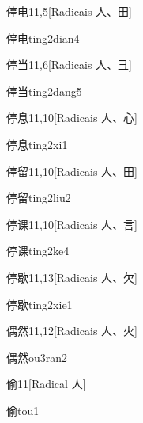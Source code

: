 \begin{entry}{停电}{11,5}[Radicais ⼈、⽥]
  \begin{phonetics}{停电}{ting2dian4}
  \end{phonetics}
\end{entry}

\begin{entry}{停当}{11,6}[Radicais ⼈、⼹]
  \begin{phonetics}{停当}{ting2dang5}
  \end{phonetics}
\end{entry}

\begin{entry}{停息}{11,10}[Radicais ⼈、⼼]
  \begin{phonetics}{停息}{ting2xi1}
  \end{phonetics}
\end{entry}

\begin{entry}{停留}{11,10}[Radicais ⼈、⽥]
  \begin{phonetics}{停留}{ting2liu2}
  \end{phonetics}
\end{entry}

\begin{entry}{停课}{11,10}[Radicais ⼈、⾔]
  \begin{phonetics}{停课}{ting2ke4}
  \end{phonetics}
\end{entry}

\begin{entry}{停歇}{11,13}[Radicais ⼈、⽋]
  \begin{phonetics}{停歇}{ting2xie1}
  \end{phonetics}
\end{entry}

\begin{entry}{偶然}{11,12}[Radicais ⼈、⽕]
  \begin{phonetics}{偶然}{ou3ran2}
  \end{phonetics}
\end{entry}

\begin{entry}{偷}{11}[Radical ⼈]
  \begin{phonetics}{偷}{tou1}
  \end{phonetics}
\end{entry}

